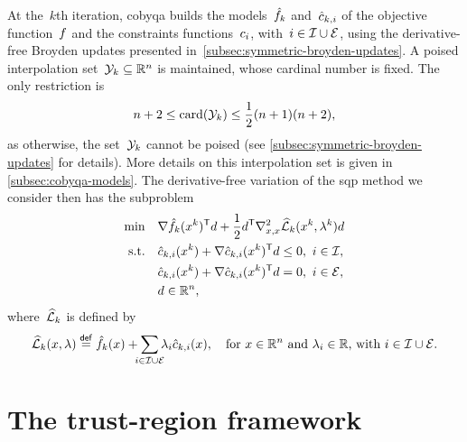 At the~$k$th iteration, \gls{cobyqa} builds the models~$\objm[k]$ and~$\conm[k]{i}$ of the objective function~$f$ and the constraints functions~$c_{i}$, with~$i \in \mathcal{I} \cup \mathcal{E}$, using the derivative-free Broyden updates presented in~\cref{subsec:symmetric-broyden-updates}.
A poised interpolation set~$\xpt[k] \subseteq \R^n$ is maintained, whose cardinal number is fixed.
The only restriction is
\begin{equation*}
    n + 2 \le \card(\xpt[k]) \le \frac{1}{2} (n + 1) (n + 2),
\end{equation*}
as otherwise, the set~$\xpt[k]$ cannot be poised (see \cref{subsec:symmetric-broyden-updates} for details).
More details on this interpolation set is given in \cref{subsec:cobyqa-models}.
The derivative-free variation of the \gls{sqp} method we consider then has the subproblem
\begin{align*}
    \min        & \quad \nabla \objm[k](\iter[k])^{\T} \step + \frac{1}{2} \step^{\T} \nabla_{x, x}^2 \lagm[k](\iter[k], \lambda^k) \step\\
    \text{s.t.} & \quad \conm[k]{i}(\iter[k]) + \nabla \conm[k]{i}(\iter[k])^{\T} \step \le 0, ~ i \in \iub,\\
                & \quad \conm[k]{i}(\iter[k]) + \nabla \conm[k]{i}(\iter[k])^{\T} \step = 0, ~ i \in \ieq,\\
                & \quad \step \in \R^n,
\end{align*}
where~$\lagm[k]$ is defined by
\begin{equation*}
    \lagm[k](\iter, \lambda) \eqdef \objm[k](\iter) + \sum_{\mathclap{i \in \iub \cup \ieq}} \lambda_i \conm[k]{i}(\iter), \quad \text{for~$\iter \in \R^n$ and~$\lambda_i \in \R$, with~$i \in \iub \cup \ieq$}.
\end{equation*}

\section{The trust-region framework}
\label{sec:trust-region}

